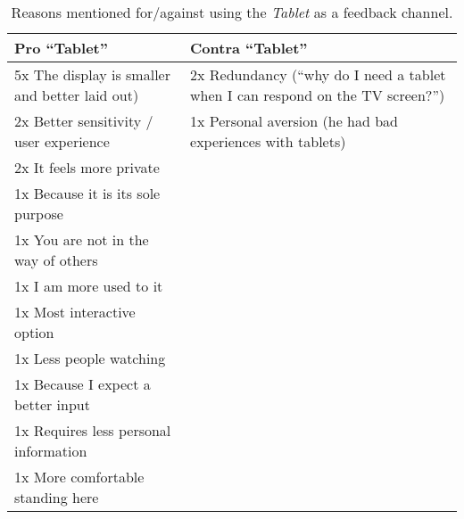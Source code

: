   \begin{table}[h]
    \small
    \center

    \begin{tabular}{p{7cm}p{7cm}}
    \toprule
    \textbf{Pro ``Tablet''}  &  \textbf{Contra ``Tablet''} \\ \midrule
    5x The display is smaller and better laid out)  &  2x Redundancy (``why do I need a tablet when I can respond on the TV screen?'') \\
    2x Better sensitivity / user experience  &  1x Personal aversion (he had bad experiences with tablets) \\
    2x It feels more private  &   \\
    1x Because it is its sole purpose  &   \\
    1x You are not in the way of others  &   \\
    1x I am more used to it  &   \\
    1x Most interactive option  &   \\
    1x Less people watching  &   \\
    1x Because I expect a better input  &   \\
    1x Requires less personal information  &   \\
    1x More comfortable standing here  &   \\
    \bottomrule
    \end{tabular}

    \caption[Feedback Channel - Tablet]{Reasons mentioned for/against using the \textit{Tablet} as a feedback channel.}
    \label{table:feedback-channel-tablet}
  \end{table}





